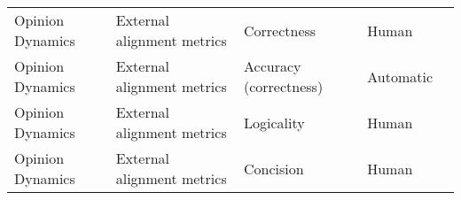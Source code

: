 \begin{small}
\begin{center}
\begin{longtable}{@{}p{}p{}p{}p{}p{}@{}}
Opinion Dynamics         & External alignment metrics          & Correctness                                                                                                                                                                                                 & Human     & \cite{He2024AgentsCourtBJ}                                                                                                                                                                                                                                                                                                                                                                                \\
Opinion Dynamics         & External alignment metrics          & Accuracy (correctness)                                                                                                                                                                                      & Automatic & \cite{Ju2024FloodingSO}                                                                                                                                                                                                                                                                                                                                                                                                   \\
Opinion Dynamics         & External alignment metrics          & Logicality                                                                                                                                                                                                  & Human     & \cite{He2024AgentsCourtBJ}                                                                                                                                                                                                                                                                                                                                                                                \\
Opinion Dynamics         & External alignment metrics          & Concision                                                                                                                                                                                                   & Human     & \cite{He2024AgentsCourtBJ}                                                                                                                                                                                                                                                                                                                                                                                \\

\end{longtable}
\end{center}
\end{small}
